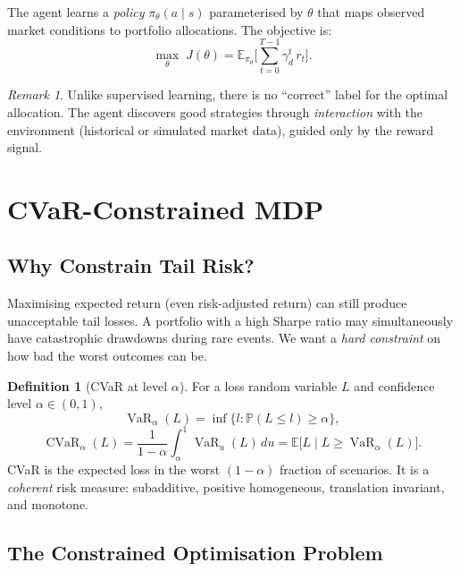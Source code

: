 \documentclass[11pt, a4paper]{article}
\theoremstyle{definition}
\newtheorem{definition}{Definition}[section]
\theoremstyle{plain}
\theoremstyle{remark}
\newtheorem{remark}{Remark}[section]
\newcommand{\VaR}{\operatorname{VaR}}
\newcommand{\CVaR}{\operatorname{CVaR}}
\newcommand{\EV}{\mathbb{E}}
\newcommand{\PV}{\mathbb{P}}
\begin{document}
The agent learns a \emph{policy} $\pi_\theta(a \mid s)$ parameterised by
$\theta$ that maps observed market conditions to portfolio allocations. The
objective is:
\begin{equation}
    \max_\theta \; J(\theta) = \EV_{\pi_\theta}
    \biggl[\sum_{t=0}^{T-1} \gamma_d^t\, r_t \biggr].
    \label{eq:rl_objective}
\end{equation}

\begin{remark}
Unlike supervised learning, there is no ``correct'' label for the optimal
allocation. The agent discovers good strategies through \emph{interaction}
with the environment (historical or simulated market data), guided only by
the reward signal.
\end{remark}


\section{CVaR-Constrained MDP}
\label{sec:cvar_cmdp}

\subsection{Why Constrain Tail Risk?}

Maximising expected return (even risk-adjusted return) can still produce
unacceptable tail losses. A portfolio with a high Sharpe ratio may
simultaneously have catastrophic drawdowns during rare events. We want a
\emph{hard constraint} on how bad the worst outcomes can be.

\begin{definition}[CVaR at level $\alpha$]
\label{def:cvar}
For a loss random variable $L$ and confidence level $\alpha \in (0,1)$,
\[
    \VaR_\alpha(L) = \inf\{l : \PV(L \leq l) \geq \alpha\},
\]
\[
    \CVaR_\alpha(L)
    = \frac{1}{1-\alpha}\int_\alpha^1 \VaR_u(L)\,du
    = \EV\bigl[L \mid L \geq \VaR_\alpha(L)\bigr].
\]
CVaR is the expected loss in the worst $(1-\alpha)$ fraction of scenarios.
It is a \emph{coherent} risk measure: subadditive, positive homogeneous,
translation invariant, and monotone.
\end{definition}

\subsection{The Constrained Optimisation Problem}
\end{document}

